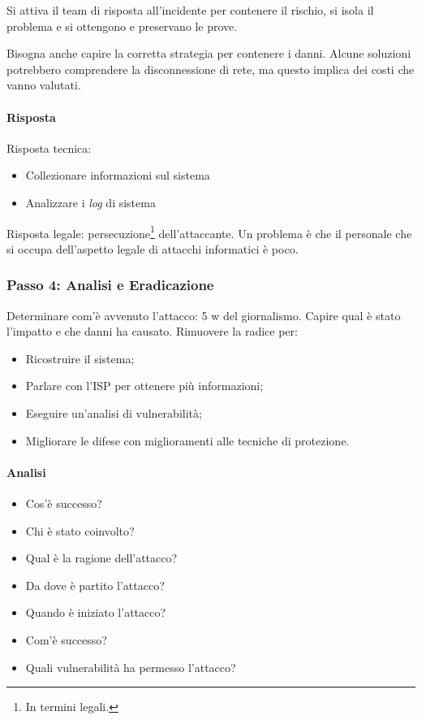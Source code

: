 Si attiva il team di risposta all'incidente per contenere il rischio, si
isola il problema e si ottengono e preservano le prove.

Bisogna anche capire la corretta strategia per contenere i danni. Alcune
soluzioni potrebbero comprendere la disconnessione di rete, ma questo implica
dei costi che vanno valutati.

\paragraph*{Risposta}

Risposta tecnica:
\begin{itemize}
\item Collezionare informazioni sul sistema
\item Analizzare i \textit{log} di sistema
\end{itemize}

Risposta legale: persecuzione\footnote{In termini legali.} dell'attaccante. Un problema è
che il personale che si occupa dell'aspetto legale di attacchi informatici è
poco.

\subsubsection{Passo 4: Analisi e Eradicazione}

Determinare com'è avvenuto l'attacco: 5 w del giornalismo. Capire qual è stato
l'impatto e che danni ha causato. Rimuovere la radice per:

\begin{itemize}
\item Ricostruire il sistema;
\item Parlare con l'ISP per ottenere più informazioni;
\item Eseguire un'analisi di vulnerabilità;
\item Migliorare le difese con miglioramenti alle tecniche di protezione.
\end{itemize}

\paragraph*{Analisi}

\begin{itemize}
\item Cos'è successo?
\item Chi è stato coinvolto?
\item Qual è la ragione dell'attacco?
\item Da dove è partito l'attacco?
\item Quando è iniziato l'attacco?
\item Com'è successo?
\item Quali vulnerabilità ha permesso l'attacco?
\end{itemize}


